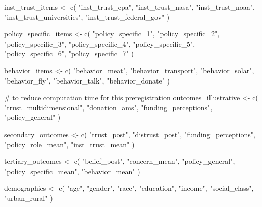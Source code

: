 \documentclass[
  letterpaper,
  DIV=11,
  numbers=noendperiod]{scrartcl}
\newenvironment{Shaded}{\begin{snugshade}}{\end{snugshade}}
\newcommand{\CommentTok}[1]{\textcolor[rgb]{0.37,0.37,0.37}{#1}}
\newcommand{\FunctionTok}[1]{\textcolor[rgb]{0.28,0.35,0.67}{#1}}
\newcommand{\NormalTok}[1]{\textcolor[rgb]{0.00,0.23,0.31}{#1}}
\newcommand{\OtherTok}[1]{\textcolor[rgb]{0.00,0.23,0.31}{#1}}
\newcommand{\StringTok}[1]{\textcolor[rgb]{0.13,0.47,0.30}{#1}}
\begin{document}
\begin{Shaded}
\begin{Highlighting}[]
\NormalTok{inst\_trust\_items }\OtherTok{\textless{}{-}} \FunctionTok{c}\NormalTok{(}
  \StringTok{"inst\_trust\_epa"}\NormalTok{,}
  \StringTok{"inst\_trust\_nasa"}\NormalTok{,}
  \StringTok{"inst\_trust\_noaa"}\NormalTok{,}
  \StringTok{"inst\_trust\_universities"}\NormalTok{,}
  \StringTok{"inst\_trust\_federal\_gov"}
\NormalTok{)}

\NormalTok{policy\_specific\_items }\OtherTok{\textless{}{-}} \FunctionTok{c}\NormalTok{(}
  \StringTok{"policy\_specific\_1"}\NormalTok{,}
  \StringTok{"policy\_specific\_2"}\NormalTok{,}
  \StringTok{"policy\_specific\_3"}\NormalTok{,}
  \StringTok{"policy\_specific\_4"}\NormalTok{,}
  \StringTok{"policy\_specific\_5"}\NormalTok{,}
  \StringTok{"policy\_specific\_6"}\NormalTok{,}
  \StringTok{"policy\_specific\_7"}
\NormalTok{)}

\NormalTok{behavior\_items }\OtherTok{\textless{}{-}} \FunctionTok{c}\NormalTok{(}
  \StringTok{"behavior\_meat"}\NormalTok{,}
  \StringTok{"behavior\_transport"}\NormalTok{,}
  \StringTok{"behavior\_solar"}\NormalTok{,}
  \StringTok{"behavior\_fly"}\NormalTok{,}
  \StringTok{"behavior\_talk"}\NormalTok{,}
  \StringTok{"behavior\_donate"}
\NormalTok{)}

\CommentTok{\# to reduce computation time for this preregistration}
\NormalTok{outcomes\_illustrative }\OtherTok{\textless{}{-}} \FunctionTok{c}\NormalTok{(}
  \StringTok{"trust\_multidimensional"}\NormalTok{,}
  \StringTok{"donation\_ams"}\NormalTok{,}
  \StringTok{"funding\_perceptions"}\NormalTok{,}
  \StringTok{"policy\_general"}
\NormalTok{)}


\NormalTok{secondary\_outcomes }\OtherTok{\textless{}{-}} \FunctionTok{c}\NormalTok{(}
  \StringTok{"trust\_post"}\NormalTok{,}
  \StringTok{"distrust\_post"}\NormalTok{,}
  \StringTok{"funding\_perceptions"}\NormalTok{,}
  \StringTok{"policy\_role\_mean"}\NormalTok{,}
  \StringTok{"inst\_trust\_mean"}
\NormalTok{)}

\NormalTok{tertiary\_outcomes }\OtherTok{\textless{}{-}} \FunctionTok{c}\NormalTok{(}
  \StringTok{"belief\_post"}\NormalTok{,}
  \StringTok{"concern\_mean"}\NormalTok{,}
  \StringTok{"policy\_general"}\NormalTok{,}
  \StringTok{"policy\_specific\_mean"}\NormalTok{,}
  \StringTok{"behavior\_mean"}
\NormalTok{)}

\NormalTok{demographics }\OtherTok{\textless{}{-}} \FunctionTok{c}\NormalTok{(}
  \StringTok{"age"}\NormalTok{,}
  \StringTok{"gender"}\NormalTok{,}
  \StringTok{"race"}\NormalTok{,}
  \StringTok{"education"}\NormalTok{,}
  \StringTok{"income"}\NormalTok{,}
  \StringTok{"social\_class"}\NormalTok{,}
  \StringTok{"urban\_rural"}
\NormalTok{)}


\end{Highlighting}
\end{Shaded}
\end{document}
